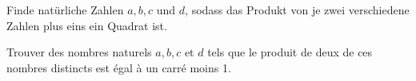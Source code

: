 Finde natürliche Zahlen $a,b,c$ und $d$, sodass das Produkt von je zwei verschiedene Zahlen plus eins ein Quadrat ist.

\bigskip

Trouver des nombres naturels $a,b,c$ et $d$ tels que le produit de deux de ces nombres distincts est égal à un carré moins 1.